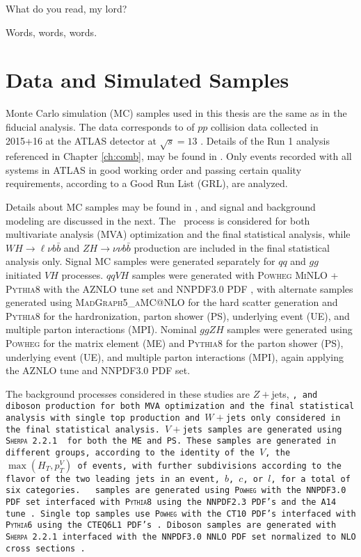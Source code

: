 \begin{savequote}[75mm]
What do you read, my lord?

Words, words, words.
\end{savequote}

\chapter{Data and Simulated Samples}
\label{ch:samples}
 Monte Carlo simulation (MC) samples used in this thesis are the same as in the fiducial analysis.  The data corresponds to \LUMI of $pp$ collision data collected in 2015+16 at the ATLAS detector at $\sqrt{s}=13$ \TeV.  Details of the Run 1 analysis referenced in Chapter \ref{ch:comb}, may be found in \cite{run1note}.  Only events recorded with all systems in ATLAS in good working order and passing certain quality requirements, according to a Good Run List (GRL), are analyzed.  

Details about MC samples may be found in \cite{modelingnote}, and signal and background modeling are discussed in the next.  The \ZH\, process is considered for both multivariate analysis (MVA) optimization and the final statistical analysis, while $WH\to\ell\nu b\bar{b}$ and $ZH\to\nu\nu b\bar{b}$ production are included in the final statistical analysis only.  Signal MC samples were generated separately for $qq$ and $gg$ initiated $VH$ processes.  $qqVH$ samples were generated with \textsc{Powheg MiNLO + Pythia8} \cite{powheg0,pythia8} with the AZNLO \cite{aznlo} tune set and NNPDF3.0 PDF \cite{nnpdf3}, with alternate samples generated using \textsc{MadGraph5\_aMC@NLO} \cite{madgraph} for the hard scatter generation and \textsc{Pythia8} for the hardronization, parton shower (PS), underlying event (UE), and multiple parton interactions (MPI).
  Nominal $ggZH$ samples were generated using \textsc{Powheg} for the matrix element (ME) and \textsc{Pythia8} for the parton shower (PS), underlying event (UE), and multiple parton interactions (MPI), again applying the AZNLO tune and NNPDF3.0 PDF set. \cite{support17}

The background processes considered in these studies are $Z+$jets, \tt, and diboson production for both MVA optimization and the final statistical analysis with single top production and $W+$jets only considered in the final statistical analysis.  $V+$jets samples are generated using \textsc{Sherpa 2.2.1} \cite{support18} for both the ME and PS.  These samples are generated in different groups, according to the identity of the $V$, the $\max\left(H_T,p_T^V\right)$ of events, with further subdivisions according to the flavor of the two leading jets in an event, $b$, $c$, or $l$, for a total of six categories.  \tt\, samples are generated using \textsc{Powheg} with the NNPDF3.0 PDF set interfaced with \textsc{Pythia8} using the NNPDF2.3 PDF's and the A14 tune \cite{support19}.  Single top samples use \textsc{Powheg} with the CT10 PDF's interfaced with \textsc{Pythia6} using the CTEQ6L1 PDF's \cite{support20,support21}.  Diboson samples are generated with \textsc{Sherpa 2.2.1} interfaced with the NNPDF3.0 NNLO PDF set normalized to NLO cross sections \cite{support22}.

